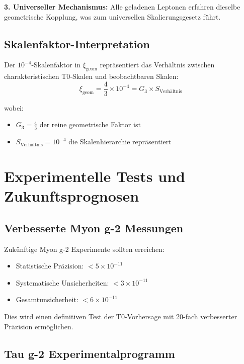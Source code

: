 \documentclass[12pt,a4paper]{report}
\newcommand{\xigeom}{\xi_{\text{geom}}}   %
\begin{document}
\textbf{3. Universeller Mechanismus:}
Alle geladenen Leptonen erfahren dieselbe geometrische Kopplung, was zum universellen Skalierungsgesetz führt.

\subsection{Skalenfaktor-Interpretation}
\label{subsec:scale_factor}

Der $10^{-4}$-Skalenfaktor in $\xigeom$ repräsentiert das Verhältnis zwischen charakteristischen T0-Skalen und beobachtbaren Skalen:
\begin{equation}
	\xigeom = \frac{4}{3} \times 10^{-4} = G_3 \times S_{\text{Verhältnis}}
	\label{eq:scale_interpretation}
\end{equation}

wobei:
\begin{itemize}
	\item $G_3 = \frac{4}{3}$ der reine geometrische Faktor ist
	\item $S_{\text{Verhältnis}} = 10^{-4}$ die Skalenhierarchie repräsentiert
\end{itemize}

\section{Experimentelle Tests und Zukunftsprognosen}
\label{sec:experimental_tests}

\subsection{Verbesserte Myon g-2 Messungen}
\label{subsec:improved_muon_measurements}

Zukünftige Myon g-2 Experimente sollten erreichen:
\begin{itemize}
	\item Statistische Präzision: $< 5 \times 10^{-11}$
	\item Systematische Unsicherheiten: $< 3 \times 10^{-11}$
	\item Gesamtunsicherheit: $< 6 \times 10^{-11}$
\end{itemize}

Dies wird einen definitiven Test der T0-Vorhersage mit 20-fach verbesserter Präzision ermöglichen.

\subsection{Tau g-2 Experimentalprogramm}
\label{subsec:tau_g2_program}
\end{document}
